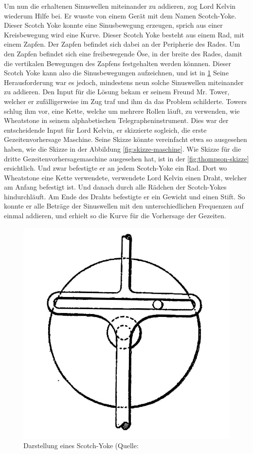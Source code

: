 Um nun die erhaltenen Sinuswellen miteinander zu addieren, zog Lord Kelvin wiederum Hilfe bei.
Er wusste von einem Gerät mit dem Namen Scotch-Yoke.
Dieser Scotch Yoke konnte eine Sinusbewegung erzeugen, sprich aus einer Kreisbewegung wird eine Kurve.
Dieser Scotch Yoke besteht aus einem Rad, mit einem Zapfen.
Der Zapfen befindet sich dabei an der Peripherie des Rades.
Um den Zapfen befindet sich eine freibewegende Öse, in der breite des Rades, damit die vertikalen Bewegungen des Zapfens festgehalten werden könnnen.
Dieser Scotch Yoke kann also die Sinusbewegungen aufzeichnen, und ist in \ref{fig:scotch-yoke}
Seine Herausforderung war es jedoch, mindestens neun solche Sinuswellen miteinander zu addieren.
Den Input für die Lösung bekam er seinem Freund Mr. Tower, welcher er zufälligerweise im Zug traf und ihm da das Problem schilderte.
Towers schlug ihm vor, eine Kette, welche um mehrere Rollen läuft, zu verwenden, wie Wheatstone in seinem alphabetischen Telegrapheninstrument.
Dies war der entscheidende Input für Lord Kelvin, er skizzierte sogleich, die erste Gezeitenvorhersage Maschine. Seine Skizze könnte vereinfacht etwa so ausgesehen haben, wie die Skizze in der Abbildung \ref{fig:skizze-maschine}.
Wie Skizze für die dritte Gezeitenvorhersagemaschine ausgesehen hat, ist in der \ref{fig:thompson-skizze} ersichtlich. 
Und zwar befestigte er an jedem Scotch-Yoke ein Rad.
Dort wo Wheatstone eine Kette verwendete, verwendete Lord Kelvin einen Draht, welcher am Anfang befestigt ist.
Und danach durch alle Rädchen der Scotch-Yokes hindurchläuft.
Am Ende des Drahts befestigte er ein Gewicht und einen Stift.
So konnte er alle Beträge der Sinuswellen mit den unterschiedlichen Frequenzen auf einmal addieren, und erhielt so die Kurve für die Vorhersage der Gezeiten.

\begin{figure}
	\centering
	\includegraphics[width=\textwidth]{"papers/gezeiten/Scotch Yoke"}
	\caption{Darstellung eines Scotch-Yoke (Quelle: \cite{gezeiten:Yoke)}
	\label{fig:scotch-yoke}}
\end{figure}

